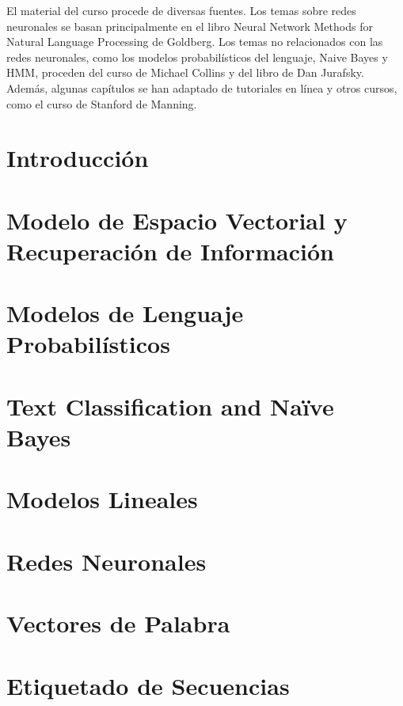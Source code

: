 \documentclass{book}
\begin{document}
El material del curso procede de diversas fuentes. Los temas sobre redes neuronales se basan principalmente en el libro Neural Network Methods for Natural Language Processing de Goldberg. Los temas no relacionados con las redes neuronales, como los modelos probabilísticos del lenguaje, Naive Bayes y HMM, proceden del curso de Michael Collins y del libro de Dan Jurafsky. Además, algunas capítulos se han adaptado de tutoriales en línea y otros cursos, como el curso de Stanford de Manning.

\chapter{Introducción}
\label{cap:intro}




\chapter{Modelo de Espacio Vectorial y Recuperación de Información}
\label{cap_ir}



\chapter{Modelos de Lenguaje Probabilísticos}
\label{cap_plm}



\chapter{Text Classification and Naïve Bayes}
\label{cap_nb}



\chapter{Modelos Lineales}
\label{cap_lineales}



\chapter{Redes Neuronales}
\label{cap_redes}


\chapter{Vectores de Palabra}
\label{cap_embeddings}



\chapter{Etiquetado de Secuencias}
\label{cap_etisec}

\end{document}

